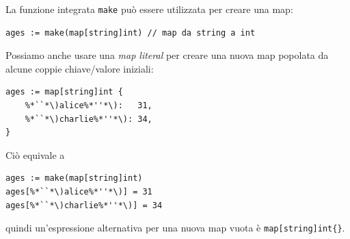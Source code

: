 La funzione integrata \verb|make| può essere utilizzata per creare una map:
\begin{lstlisting}[label={lst:lstlisting3-3.1}]
ages := make(map[string]int) // map da string a int
\end{lstlisting}
Possiamo anche usare una \textit{map literal} per creare una nuova map popolata da alcune coppie chiave/valore iniziali:
\begin{lstlisting}[frame=single, label={lst:lstlisting3-3.2}]
ages := map[string]int {
    %*``*\)alice%*''*\):   31,
    %*``*\)charlie%*''*\): 34,
}
\end{lstlisting}
Ciò equivale a
\begin{lstlisting}[frame=single, label={lst:lstlisting3-3.3}]
ages := make(map[string]int)
ages[%*``*\)alice%*''*\)] = 31
ages[%*``*\)charlie%*''*\)] = 34
\end{lstlisting}
quindi un'espressione alternativa per una nuova map vuota è \verb|map[string]int{}|.

